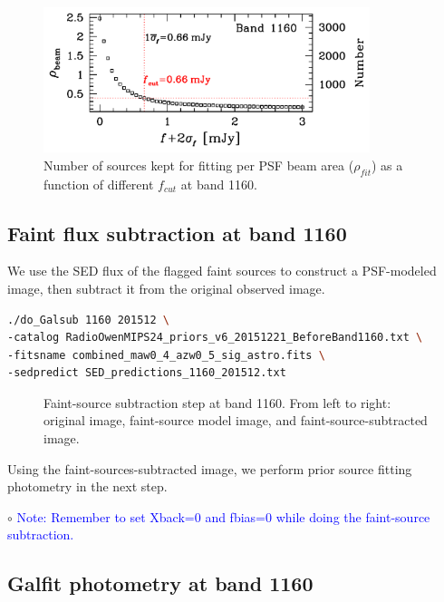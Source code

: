 \documentclass[11pt,a4paper]{article}
\begin{document}
\begin{figure}[H]
	\caption{Number of sources kept for fitting per PSF beam area ($\rho_{fit}$) as a function of different $f_{cut}$ at band 1160.}
	\includegraphics[width=0.85\textwidth]{plot_cutting_flux_1160}
\end{figure}

\subsection{Faint flux subtraction at band 1160}
\label{Band1160_Galsub}

We use the SED flux of the flagged faint sources to construct a PSF-modeled image, then subtract it from the original observed image. 

\begin{lstlisting}[language=bash]
./do_Galsub 1160 201512 \
-catalog RadioOwenMIPS24_priors_v6_20151221_BeforeBand1160.txt \
-fitsname combined_maw0_4_azw0_5_sig_astro.fits \
-sedpredict SED_predictions_1160_201512.txt
\end{lstlisting}

\begin{figure}[H]
	\caption{Faint-source subtraction step at band 1160. From left to right: original image, faint-source model image, and faint-source-subtracted image.}
\end{figure}

Using the faint-sources-subtracted image, we perform prior source fitting photometry in the next step. 

\indent\hspace{15pt}$\circ$ 
\textcolor{blue}{Note: Remember to set Xback=0 and fbias=0 while doing the faint-source subtraction.}
\\

\subsection{Galfit photometry at band 1160}
\label{Band1160_Galfit}
\end{document}
